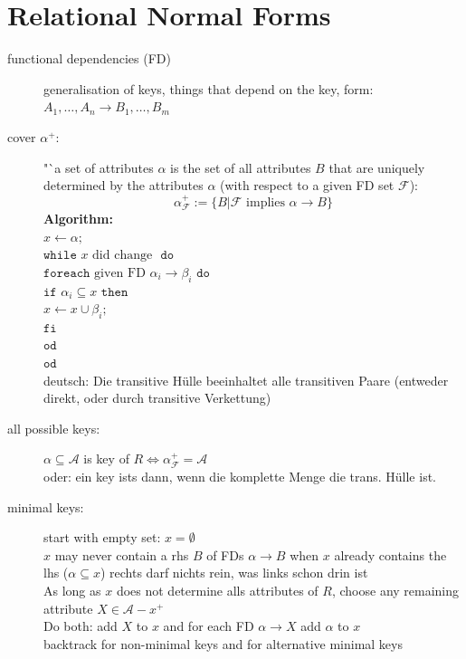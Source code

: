 \documentclass{scrartcl}
\begin{document}
\section*{Relational Normal Forms}
\begin{description}
	\item[functional dependencies (FD)] generalisation of keys, things that depend on the key, form: $A_1,\dots,A_n\to B_1,\dots,B_m$ 
	\item[cover $\alpha^+$:] "`a set of attributes $\alpha$ is the set of all attributes $B$ that are uniquely determined by the attributes $\alpha$ (with respect to a given FD set $\mathcal{F}$): \[ \alpha^+_\mathcal{F} := \{ B \vert \mathcal{F} \textrm{ implies } \alpha \to B\} \]
	\textbf{Algorithm:}\\
$x \leftarrow \alpha ;$\\
$\texttt{while } x \text{ did change } \texttt{ do}$\\
\qquad$\texttt{foreach} \text{ given FD } \alpha_i\to\beta_i \texttt{ do}$\\
\qquad\qquad$\texttt{if } \alpha_i\subseteq x \texttt{ then}$\\
\qquad\qquad\qquad$x \leftarrow x \cup \beta_i;$\\
\qquad\qquad$\texttt{fi}$\\
\qquad$\texttt{od}$\\
$\texttt{od}$\\
	deutsch: Die transitive Hülle beeinhaltet alle transitiven Paare (entweder direkt, oder durch transitive Verkettung)
	\item[all possible keys:] $\alpha \subseteq \mathcal{A}$ is key of $R \Leftrightarrow \alpha^+_\mathcal{F} = \mathcal{A}$ \\
	oder: ein key ists dann, wenn die komplette Menge die trans. Hülle ist.
	\item[minimal keys:] 
	start with empty set: $x=\emptyset$\\
	$x$ may never contain a rhs $B$ of FDs $\alpha \to B$ when $x$ already contains the lhs ($\alpha \subseteq x$) {\tiny rechts darf nichts rein, was links schon drin ist}\\
	As long as $x$ does not determine alls attributes of $R$, choose any remaining attribute $X\in\mathcal{A}-x^+$ \\
	Do both: add $X$ to $x$ and for each FD $\alpha\to X$ add $\alpha$ to $x$\\
	backtrack for non-minimal keys and for alternative minimal keys
	

\end{description}
\end{document}
